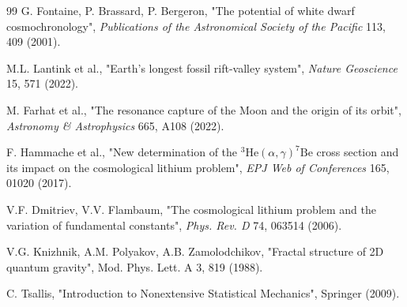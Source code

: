 \documentclass[11pt,a4paper]{article}
\theoremstyle{remark}
\begin{document}
\begin{thebibliography}{99}
		G. Fontaine, P. Brassard, P. Bergeron, "The potential of white dwarf cosmochronology", \emph{Publications of the Astronomical Society of the Pacific} 113, 409 (2001).
		
		M.L. Lantink et al., "Earth's longest fossil rift-valley system", \emph{Nature Geoscience} 15, 571 (2022).
		
		M. Farhat et al., "The resonance capture of the Moon and the origin of its orbit", \emph{Astronomy \& Astrophysics} 665, A108 (2022).
		
		F. Hammache et al., "New determination of the \(^3\mathrm{He}(\alpha,\gamma)^7\mathrm{Be}\) cross section and its impact on the cosmological lithium problem", \emph{EPJ Web of Conferences} 165, 01020 (2017).
		
		V.F. Dmitriev, V.V. Flambaum, "The cosmological lithium problem and the variation of fundamental constants", \emph{Phys. Rev. D} 74, 063514 (2006).
		
		V.G. Knizhnik, A.M. Polyakov, A.B. Zamolodchikov, "Fractal structure of 2D quantum gravity", Mod. Phys. Lett. A 3, 819 (1988).
		
		C. Tsallis, "Introduction to Nonextensive Statistical Mechanics", Springer (2009).
		
	\end{thebibliography}
	
\end{document}

